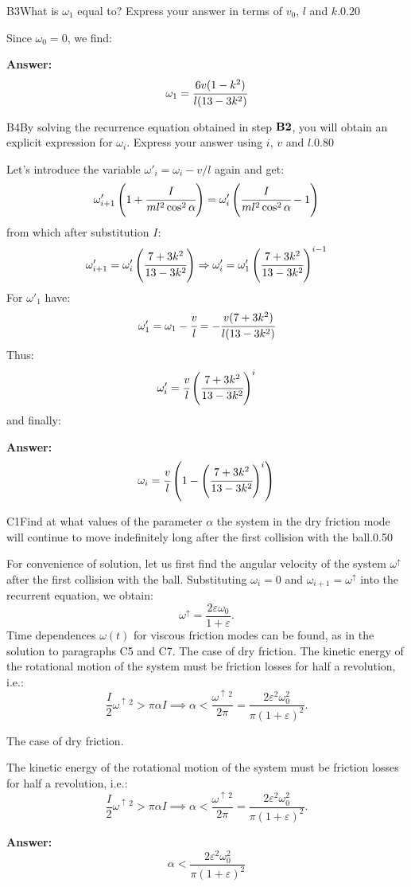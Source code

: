 \documentclass[11pt,a4paper]{article}
\begin{document}
\begin{solcard}{B3}{What is $\omega_1$ equal to? Express your answer in terms of $v_0$, $l$ and $k$.}{0.20}

Since $\omega_0=0$, we find:

\par\smallskip\noindent\textbf{Answer:} $$\omega_1=\cfrac{6v(1-k^2)}{l(13-3k^2)} $$
\end{solcard}
\begin{solcard}{B4}{By solving the recurrence equation obtained in step $\bf B2$, you will obtain an explicit expression for $\omega_i$. Express your answer using $i$, $v$ and $l$.}{0.80}

Let's introduce the variable $\omega'_i=\omega_i-v/l$ again and get: $$\omega'_{i+1}\left(1+\cfrac{I}{ml^2\cos^2\alpha}\right)=\omega'_i\left(\cfrac{I}{ml^2\cos^2\alpha}-1\right) $$ from which after substitution $I$: $$\omega'_{i+1}=\omega'_i\left(\cfrac{7+3k^2}{13-3k^2}\right)\Rightarrow \omega'_i=\omega'_1\left(\cfrac{7+3k^2}{13-3k^2}\right)^{i-1} $$ For $\omega'_1$ have: $$\omega'_1=\omega_1-\cfrac{v}{l}=-\cfrac{v(7+3k^2)}{l(13-3k^2)} $$ Thus: $$\omega'_i=\cfrac{v}{l}\left(\cfrac{7+3k^2}{13-3k^2}\right)^i $$ and finally:
\par\smallskip\noindent\textbf{Answer:} $$\omega_i=\cfrac{v}{l}\left(1-\left(\cfrac{7+3k^2}{13-3k^2}\right)^i\right) $$
\end{solcard}

\begin{solcard}{C1}{Find at what values of the parameter $\alpha$ the system in the dry friction mode will continue to move indefinitely long after the first collision with the ball.}{0.50}

For convenience of solution, let us first find the angular velocity of the system $\omega^\uparrow$ after the first collision with the ball. Substituting $\omega_i=0$ and $\omega_{i+1}=\omega^\uparrow$ into the recurrent equation, we obtain: \[\omega^\uparrow=\frac{2\varepsilon\omega_0}{1+\varepsilon}.\]Time dependences $\omega(t)$ for viscous friction modes can be found, as in the solution to paragraphs C5 and C7. The case of dry friction. The kinetic energy of the rotational motion of the system must be friction losses for half a revolution, i.e.: \[\frac I2\omega^{\uparrow\,2} > \pi\alpha I\implies \alpha < \frac{\omega^{\uparrow\,2}}{2\pi}=\frac{2\varepsilon^2\omega_0^2}{\pi(1+\varepsilon)^2}.\]


The case of dry friction.


The kinetic energy of the rotational motion of the system must be friction losses for half a revolution, i.e.: \[\frac I2\omega^{\uparrow\,2} > \pi\alpha I\implies \alpha < \frac{\omega^{\uparrow\,2}}{2\pi}=\frac{2\varepsilon^2\omega_0^2}{\pi(1+\varepsilon)^2}.\]

\par\smallskip\noindent\textbf{Answer:} \[\alpha < \frac{2\varepsilon^2\omega_0^2}{\pi(1+\varepsilon)^2}\]
\end{solcard}
\end{document}
